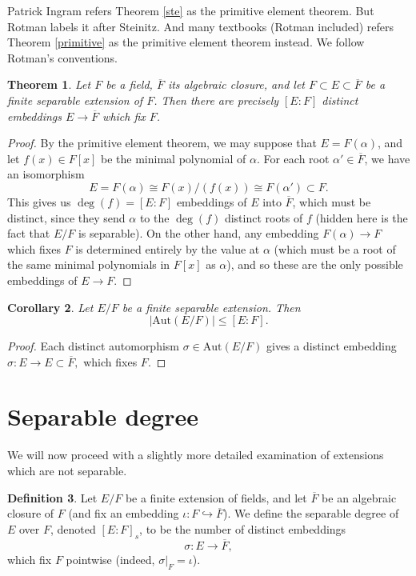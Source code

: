 \documentclass[12pt]{report}
\newtheorem{thm}{Theorem}[section]
\newtheorem{cor}[thm]{Corollary}
\theoremstyle{definition}
\newtheorem{defn}[thm]{Definition}
\def\Aut{\text{Aut}}
\def\aa{\alpha}
\begin{document}
\begin{remark}
    Patrick Ingram refers Theorem \ref{ste} as the primitive element theorem. But Rotman labels it after Steinitz. And many textbooks (Rotman included) refers Theorem \ref{primitive} as the primitive element theorem instead. We follow Rotman's conventions.
\end{remark}

\begin{thm}\label{acc}
    Let $F$ be a field, $\overline{F}$ its algebraic closure, and let $F \subset E \subset \overline{F}$ be a finite separable extension of $F$. Then there are precisely $[E:F]$ distinct embeddings $E\to \overline{F}$ which fix $F$.
\end{thm}

\begin{proof}
    By the primitive element theorem, we may suppose that $E = F(\aa)$, and let $f(x) \in F[x]$ be the minimal polynomial of $\aa$. For each root $\aa' \in \overline{F}$, we have an isomorphism $$E = F(\aa) \cong F(x)/(f(x)) \cong F(\aa') \subset F.$$
    This gives us $\deg(f) = [E:F]$ embeddings of $E$ into $\overline{F}$, which must be distinct, since they send $\aa$ to the $\deg(f)$ distinct roots of $f$ (hidden here is the fact that $E/F$ is separable). 
    On the other hand, any embedding $F(\aa) \to F$ which fixes $F$ is determined entirely by the value at $\aa$ (which must be a root of the same minimal polynomials in $F[x]$ as $\aa$), and so these are the only possible embeddings of $E \to F$.
\end{proof}

\begin{cor}\label{cor1}
    Let $E/F$ be a finite separable extension. Then
     $$|\Aut(E/F)| \leq [E:F].$$
\end{cor}

\begin{proof}
    Each distinct automorphism $\sigma\in\Aut(E/F)$ gives a distinct embedding $\sigma : E \to E \subset \overline{F},$ which fixes $F$.
\end{proof}

\section{Separable degree}

We will now proceed with a slightly more detailed examination of extensions which are not separable.

\begin{defn}
    Let $E/F$ be a finite extension of fields, and let $\overline{F}$ be an algebraic closure of $F$ (and fix an embedding $\iota: F\hookrightarrow\overline{F}$). We define the separable degree of $E$ over $F$, denoted $[E : F]_s$, to be the number of distinct embeddings $$\sigma: E\to \overline{F},$$ which fix $F$ pointwise (indeed, $\sigma|_F=\iota$).
\end{defn}
\end{document}
